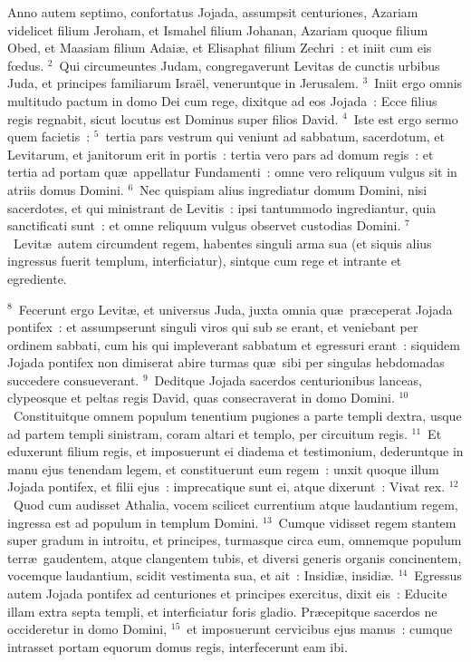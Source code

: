\lettrine[lines=10,image=true,loversize=0.05,lraise=-0.03]{A}{}nno autem septimo, confortatus Jojada, assumpsit centuriones, Azariam videlicet filium Jeroham, et Ismahel filium Johanan, Azariam quoque filium Obed, et Maasiam filium Adai\ae , et Elisaphat filium Zechri~: et iniit cum eis fœdus.
${}^{2}$~Qui circumeuntes Judam, congregaverunt Levitas de cunctis urbibus Juda, et principes familiarum Isra\"el, veneruntque in Jerusalem.
${}^{3}$~Iniit ergo omnis multitudo pactum in domo Dei cum rege, dixitque ad eos Jojada~: Ecce filius regis regnabit, sicut locutus est Dominus super filios David.
${}^{4}$~Iste est ergo sermo quem facietis~:
${}^{5}$~tertia pars vestrum qui veniunt ad sabbatum, sacerdotum, et Levitarum, et janitorum erit in portis~: tertia vero pars ad domum regis~: et tertia ad portam qu\ae\ appellatur Fundamenti~: omne vero reliquum vulgus sit in atriis domus Domini.
${}^{6}$~Nec quispiam alius ingrediatur domum Domini, nisi sacerdotes, et qui ministrant de Levitis~: ipsi tantummodo ingrediantur, quia sanctificati sunt~: et omne reliquum vulgus observet custodias Domini.
${}^{7}$~Levit\ae\ autem circumdent regem, habentes singuli arma sua (et siquis alius ingressus fuerit templum, interficiatur), sintque cum rege et intrante et egrediente.


${}^{8}$~Fecerunt ergo Levit\ae , et universus Juda, juxta omnia qu\ae\ pr\ae ceperat Jojada pontifex~: et assumpserunt singuli viros qui sub se erant, et veniebant per ordinem sabbati, cum his qui impleverant sabbatum et egressuri erant~: siquidem Jojada pontifex non dimiserat abire turmas qu\ae\ sibi per singulas hebdomadas succedere consueverant.
${}^{9}$~Deditque Jojada sacerdos centurionibus lanceas, clypeosque et peltas regis David, quas consecraverat in domo Domini.
${}^{10}$~Constituitque omnem populum tenentium pugiones a parte templi dextra, usque ad partem templi sinistram, coram altari et templo, per circuitum regis.
${}^{11}$~Et eduxerunt filium regis, et imposuerunt ei diadema et testimonium, dederuntque in manu ejus tenendam legem, et constituerunt eum regem~: unxit quoque illum Jojada pontifex, et filii ejus~: imprecatique sunt ei, atque dixerunt~: Vivat rex.
${}^{12}$~Quod cum audisset Athalia, vocem scilicet currentium atque laudantium regem, ingressa est ad populum in templum Domini.
${}^{13}$~Cumque vidisset regem stantem super gradum in introitu, et principes, turmasque circa eum, omnemque populum terr\ae\ gaudentem, atque clangentem tubis, et diversi generis organis concinentem, vocemque laudantium, scidit vestimenta sua, et ait~: Insidi\ae , insidi\ae .
${}^{14}$~Egressus autem Jojada pontifex ad centuriones et principes exercitus, dixit eis~: Educite illam extra septa templi, et interficiatur foris gladio. Pr\ae cepitque sacerdos ne occideretur in domo Domini,
${}^{15}$~et imposuerunt cervicibus ejus manus~: cumque intrasset portam equorum domus regis, interfecerunt eam ibi.


